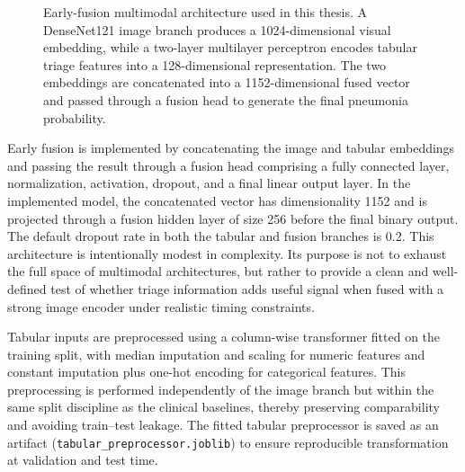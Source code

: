 \begin{figure}[htbp]
{%
    }
    \caption{Early-fusion multimodal architecture used in this thesis. A DenseNet121 image branch produces a 1024-dimensional visual embedding, while a two-layer multilayer perceptron encodes tabular triage features into a 128-dimensional representation. The two embeddings are concatenated into a 1152-dimensional fused vector and passed through a fusion head to generate the final pneumonia probability.}
    \label{fig:early_fusion_architecture}
\end{figure}

Early fusion is implemented by concatenating the image and tabular embeddings and passing the result through a fusion head comprising a fully connected layer, normalization, activation, dropout, and a final linear output layer. In the implemented model, the concatenated vector has dimensionality 1152 and is projected through a fusion hidden layer of size 256 before the final binary output. The default dropout rate in both the tabular and fusion branches is 0.2. This architecture is intentionally modest in complexity. Its purpose is not to exhaust the full space of multimodal architectures, but rather to provide a clean and well-defined test of whether triage information adds useful signal when fused with a strong image encoder under realistic timing constraints.

Tabular inputs are preprocessed using a column-wise transformer fitted on the training split, with median imputation and scaling for numeric features and constant imputation plus one-hot encoding for categorical features. This preprocessing is performed independently of the image branch but within the same split discipline as the clinical baselines, thereby preserving comparability and avoiding train--test leakage. The fitted tabular preprocessor is saved as an artifact (\texttt{tabular\_preprocessor.joblib}) to ensure reproducible transformation at validation and test time.

